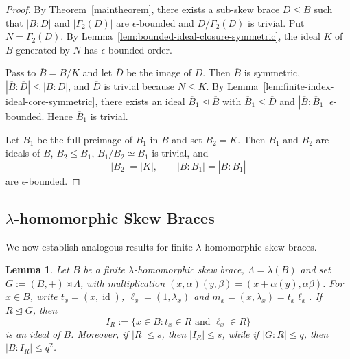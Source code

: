 \documentclass[10pt,a4paper]{amsart}
\numberwithin{equation}{section}
\newtheorem{lem}[equation]{Lemma}
\begin{document}
\begin{proof}
By Theorem~\ref{maintheorem}, there exists a sub-skew brace $D\leqslant B$ such that $|B:D|$ and $|\Gamma_2(D)|$ are $\epsilon$-bounded and $D/\Gamma_2(D)$ is trivial. Put $N=\Gamma_2(D)$. By Lemma~\ref{lem:bounded-ideal-closure-symmetric}, the ideal $K$ of $B$ generated by $N$ has $\epsilon$-bounded order.

Pass to $\overline B=B/K$ and let $\overline D$ be the image of $D$. Then $\overline B$ is symmetric, $|\overline B:\overline D|\leqslant |B:D|$, and $\overline D$ is trivial because $N\leqslant K$. By Lemma~\ref{lem:finite-index-ideal-core-symmetric}, there exists an ideal $\overline B_1\trianglelefteq\overline B$ with $\overline B_1\leqslant\overline D$ and $|\overline B:\overline B_1|$ $\epsilon$-bounded. Hence $\overline B_1$ is trivial.

Let $B_1$ be the full preimage of $\overline B_1$ in $B$ and set $B_2=K$. Then $B_1$ and $B_2$ are ideals of $B$, $B_2\leqslant B_1$, $B_1/B_2\simeq\overline B_1$ is trivial, and
$$
|B_2|=|K|,\qquad |B:B_1|=|\overline B:\overline B_1|
$$
are $\epsilon$-bounded.
\end{proof}



\subsection{$\lambda$-homomorphic Skew Braces}

We now establish analogous results for finite $\lambda$-homomorphic skew braces.

\begin{lem}\label{lem:lambda-homomorphic-bridge}
Let $B$ be a finite $\lambda$-homomorphic skew brace,  $\Lambda=\lambda(B)$ and set $G:=(B,+)\rtimes\Lambda$, with multiplication $(x,\alpha)(y,\beta)=(x+\alpha(y),\alpha\beta)$. For $x\in B$, write $t_x=(x,\operatorname{id})$, $\ell_x=(1,\lambda_x)$ and $m_x=(x,\lambda_x)=t_x\ell_x$. If $R\unlhd G$, then
$$
I_R:=\{x\in B:t_x\in R\text{ and }\ell_x\in R\}
$$
is an ideal of $B$. Moreover, if $|R|\leqslant s$, then $|I_R|\leqslant s$, while if $|G:R|\leqslant q$, then $|B:I_R|\leqslant q^2$.
\end{lem}
\end{document}
